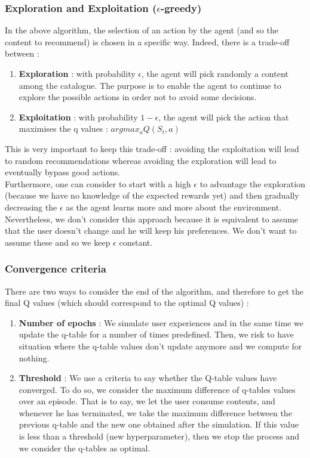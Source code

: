 \documentclass[a4paper]{article}
\begin{document}
\newpage

\subsubsection{Exploration and Exploitation ($\epsilon$-greedy)}


In the above algorithm, the selection of an action by the agent (and so the content to recommend) is chosen in a specific way. Indeed, there is a trade-off between : 
	\begin{enumerate}
		\item \textbf{Exploration} : with probability $\epsilon$, the agent will pick randomly a content among the catalogue. The purpose is to enable the agent to continue to explore the possible actions in order not to avoid some decisions.  
		\item \textbf{Exploitation} : with probability $1 - \epsilon$, the agent will pick the action that maximises the q values : $argmax_{a}  Q(S_t, a)   $
	\end{enumerate}
This is very important to keep this trade-off : avoiding the exploitation will lead to random recommendations whereas avoiding the exploration will lead to eventually bypass good actions. \\
Furthermore, one can consider to start with a high $\epsilon$ to advantage the exploration (because we have no knowledge of the expected rewards yet) and then gradually decreasing the $\epsilon$ as the agent learns more and more about the environment.\\
 Nevertheless, we don't consider this approach because it is equivalent to assume that the user doesn't change and he will keep his preferences. We don't want to assume these and so we keep $\epsilon$ constant.  
    
    
\subsubsection{Convergence criteria}
There are two ways to consider the end of the algorithm, and therefore to get the final Q values (which should correspond to the optimal Q values) : 
	\begin{enumerate}
		\item \textbf{Number of epochs} : We simulate user experiences and in the same time we update the q-table for a number of times predefined. Then, we risk to have situation where the q-table values don't update anymore and we compute for nothing.
		\item \textbf{Threshold} : We use a criteria to say whether the Q-table values have converged. To do so, we consider the maximum difference of q-tables values over an episode. That is to say, we let the user consume contents, and whenever he has terminated, we take the maximum difference between the previous q-table and the new one obtained after the simulation. If this value is less than a threshold (new hyperparameter), then we stop the process and we consider the q-tables as optimal.
	\end{enumerate}
    
\end{document}
